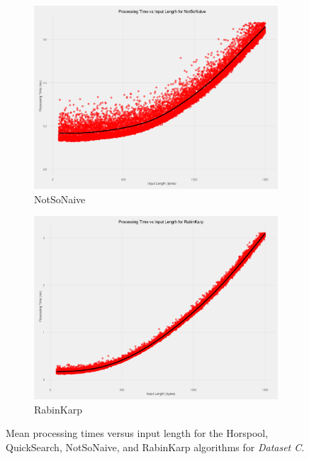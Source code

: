 \documentclass[11pt]{article}
\begin{document}
\begin{figure}[!htb]
\begin{subfigure}[b]{0.48\textwidth}
      \includegraphics[width=\textwidth]{images/processing_speed_vs_input_length_no_matches_NotSoNaive}
      \caption{NotSoNaive}
      \label{figure-processingtimevslengthnotsonaive}
  \end{subfigure}
  \begin{subfigure}[b]{0.48\textwidth}
      \includegraphics[width=\textwidth]{images/processing_speed_vs_input_length_no_matches_RabinKarp}
      \caption{RabinKarp}
      \label{figure-processingtimevslengthrabinkarp}
  \end{subfigure}
  \caption{Mean processing times versus input length for the Horspool, QuickSearch, NotSoNaive, and RabinKarp algorithms for \textit{Dataset C}.}
  \label{figure-individualalgorithmsvslength}
\end{figure}
\end{document}
